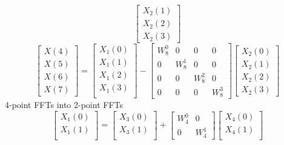 \documentclass[journal,12pt,twocolumn]{IEEEtran}
\renewcommand\thesection{\arabic{section}}
\begin{document}
\begin{enumerate}[label=\arabic*.,ref=\thesection.\theenumi]
\begin{equation}
\begin{bmatrix}
		X_{2}(1) \\ 
		X_{2}(2) \\
		X_{2}(3)
	\end{bmatrix}
\end{equation}
\begin{equation}
	\begin{bmatrix}
		X(4) \\ 
		X(5) \\ 
		X(6) \\ 
		X(7)
	\end{bmatrix}
	=
	\begin{bmatrix}
		X_{1}(0) \\ 
		X_{1}(1)\\ 
		X_{1}(2)\\
		X_{1}(3)\\
	\end{bmatrix}
	-
	\begin{bmatrix}
		W^{0}_{8} & 0 & 0 & 0\\
		0 & W^{1}_{8} & 0 & 0\\
		0 & 0 & W^{2}_{8} & 0\\
		0 & 0 & 0 & W^{3}_{8}
	\end{bmatrix}
	\begin{bmatrix}
		X_{2}(0) \\ 
		X_{2}(1) \\ 
		X_{2}(2) \\
		X_{2}(3)
	\end{bmatrix}
\end{equation}
4-point FFTs into 2-point FFTs
\begin{equation}
	\begin{bmatrix}
		X_{1}(0) \\ 
		X_{1}(1)\\ 
	\end{bmatrix}
	=
	\begin{bmatrix}
		X_{3}(0) \\ 
		X_{3}(1)\\ 
	\end{bmatrix}
	+
	\begin{bmatrix}
		W^{0}_{4} & 0\\
		0 & W^{1}_{4}
	\end{bmatrix}
	\begin{bmatrix}
		X_{4}(0) \\ 
		X_{4}(1) \\ 
	\end{bmatrix}
\end{equation}
\begin{equation}

\end{equation}
\end{enumerate}
\end{document}
